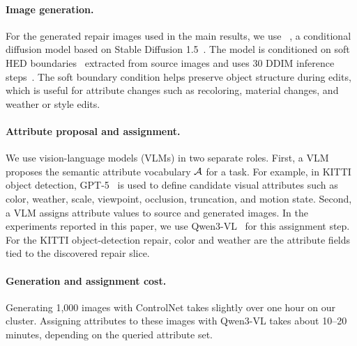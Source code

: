 \paragraph{Image generation.}
For the generated repair images used in the main results, we use \controlnet~\citep{zhang2023adding}, a conditional diffusion model based on Stable Diffusion 1.5~\citep{rombach2022high}. The model is conditioned on soft HED boundaries~\citep{xie2015holistically} extracted from source images and uses 30 DDIM inference steps~\citep{ddim}. The soft boundary condition helps preserve object structure during edits, which is useful for attribute changes such as recoloring, material changes, and weather or style edits.

\paragraph{Attribute proposal and assignment.}
We use vision-language models (VLMs) in two separate roles. First, a VLM proposes the semantic attribute vocabulary $\mathcal{A}$ for a task. For example, in KITTI object detection, GPT-5~\citep{openai2025gpt5} is used to define candidate visual attributes such as color, weather, scale, viewpoint, occlusion, truncation, and motion state. Second, a VLM assigns attribute values to source and generated images. In the experiments reported in this paper, we use Qwen3-VL~\citep{bai2025qwen3vl} for this assignment step. For the KITTI object-detection repair, color and weather are the attribute fields tied to the discovered repair slice.

\paragraph{Generation and assignment cost.}
Generating 1,000 images with ControlNet takes slightly over one hour on our cluster. Assigning attributes to these images with Qwen3-VL takes about 10--20 minutes, depending on the queried attribute set.

